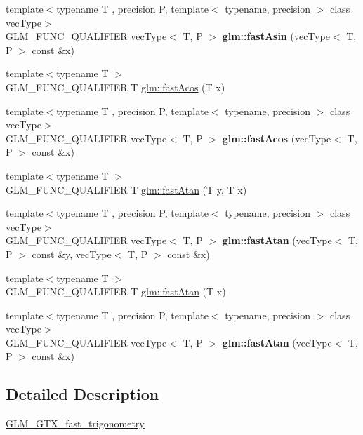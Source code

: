 \begin{DoxyCompactItemize}
\item 
\mbox{\label{fast__trigonometry_8inl_a5421346d5e7544a997ad0c9ec40456f7}} 
{\footnotesize template$<$typename T , precision P, template$<$ typename, precision $>$ class vec\+Type$>$ }\\G\+L\+M\+\_\+\+F\+U\+N\+C\+\_\+\+Q\+U\+A\+L\+I\+F\+I\+ER vec\+Type$<$ T, P $>$ {\bfseries glm\+::fast\+Asin} (vec\+Type$<$ T, P $>$ const \&x)
\item 
{\footnotesize template$<$typename T $>$ }\\G\+L\+M\+\_\+\+F\+U\+N\+C\+\_\+\+Q\+U\+A\+L\+I\+F\+I\+ER T \hyperlink{group__gtx__fast__trigonometry_ga9721d63356e5d94fdc4b393a426ab26b}{glm\+::fast\+Acos} (T x)
\item 
\mbox{\label{fast__trigonometry_8inl_a297ec5f203c6fec20424ef3703771067}} 
{\footnotesize template$<$typename T , precision P, template$<$ typename, precision $>$ class vec\+Type$>$ }\\G\+L\+M\+\_\+\+F\+U\+N\+C\+\_\+\+Q\+U\+A\+L\+I\+F\+I\+ER vec\+Type$<$ T, P $>$ {\bfseries glm\+::fast\+Acos} (vec\+Type$<$ T, P $>$ const \&x)
\item 
{\footnotesize template$<$typename T $>$ }\\G\+L\+M\+\_\+\+F\+U\+N\+C\+\_\+\+Q\+U\+A\+L\+I\+F\+I\+ER T \hyperlink{group__gtx__fast__trigonometry_ga8d197c6ef564f5e5d59af3b3f8adcc2c}{glm\+::fast\+Atan} (T y, T x)
\item 
\mbox{\label{fast__trigonometry_8inl_ae44077649af44bfe95fab2d4576c5dbe}} 
{\footnotesize template$<$typename T , precision P, template$<$ typename, precision $>$ class vec\+Type$>$ }\\G\+L\+M\+\_\+\+F\+U\+N\+C\+\_\+\+Q\+U\+A\+L\+I\+F\+I\+ER vec\+Type$<$ T, P $>$ {\bfseries glm\+::fast\+Atan} (vec\+Type$<$ T, P $>$ const \&y, vec\+Type$<$ T, P $>$ const \&x)
\item 
{\footnotesize template$<$typename T $>$ }\\G\+L\+M\+\_\+\+F\+U\+N\+C\+\_\+\+Q\+U\+A\+L\+I\+F\+I\+ER T \hyperlink{group__gtx__fast__trigonometry_gae25de86a968490ff56856fa425ec9d30}{glm\+::fast\+Atan} (T x)
\item 
\mbox{\label{fast__trigonometry_8inl_a89520a2015e9c9f5b1a202e7e4dcc7ea}} 
{\footnotesize template$<$typename T , precision P, template$<$ typename, precision $>$ class vec\+Type$>$ }\\G\+L\+M\+\_\+\+F\+U\+N\+C\+\_\+\+Q\+U\+A\+L\+I\+F\+I\+ER vec\+Type$<$ T, P $>$ {\bfseries glm\+::fast\+Atan} (vec\+Type$<$ T, P $>$ const \&x)
\end{DoxyCompactItemize}


\subsection{Detailed Description}
\hyperlink{group__gtx__fast__trigonometry}{G\+L\+M\+\_\+\+G\+T\+X\+\_\+fast\+\_\+trigonometry} 